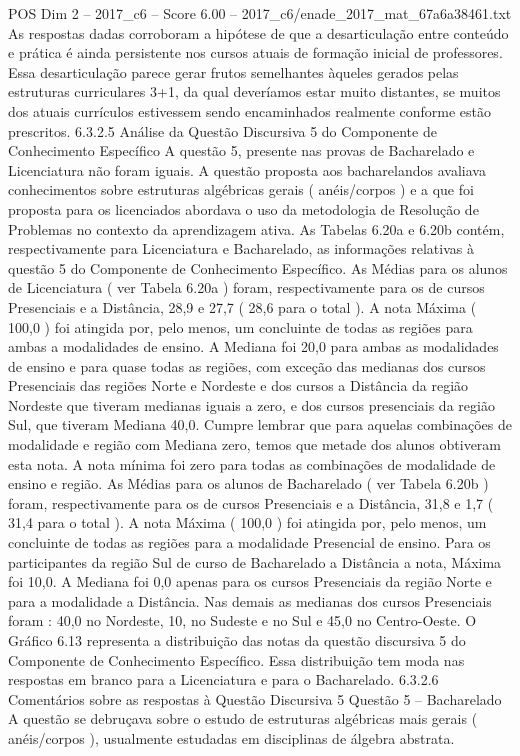 \begin{textsample}{POS Dim 2 – 2017\_c6 – Score 6.00 – 2017\_c6/enade\_2017\_mat\_67a6a38461.txt}
As respostas dadas corroboram a hipótese de que a desarticulação entre conteúdo e prática é ainda persistente nos cursos atuais de formação inicial de professores.
Essa desarticulação parece gerar frutos semelhantes àqueles gerados pelas estruturas curriculares 3+1, da qual deveríamos estar muito distantes, se muitos dos atuais currículos estivessem sendo encaminhados realmente conforme estão prescritos. 6.3.2.5 Análise da Questão Discursiva 5 do Componente de Conhecimento Específico A questão 5, presente nas provas de Bacharelado e Licenciatura não foram iguais.
A questão proposta aos bacharelandos avaliava conhecimentos sobre estruturas algébricas gerais ( anéis/corpos ) e a que foi proposta para os licenciados abordava o uso da metodologia de Resolução de Problemas no contexto da aprendizagem ativa.
As Tabelas 6.20a e 6.20b contém, respectivamente para Licenciatura e Bacharelado, as informações relativas à questão 5 do Componente de Conhecimento Específico.
As Médias para os alunos de Licenciatura ( ver Tabela 6.20a ) foram, respectivamente para os de cursos Presenciais e a Distância, 28,9 e 27,7 ( 28,6 para o total ).
A nota Máxima ( 100,0 ) foi atingida por, pelo menos, um concluinte de todas as regiões para ambas a modalidades de ensino.
A Mediana foi 20,0 para ambas as modalidades de ensino e para quase todas as regiões, com exceção das medianas dos cursos Presenciais das regiões Norte e Nordeste e dos cursos a Distância da região Nordeste que tiveram medianas iguais a zero, e dos cursos presenciais da região Sul, que tiveram Mediana 40,0.
Cumpre lembrar que para aquelas combinações de modalidade e região com Mediana zero, temos que metade dos alunos obtiveram esta nota.
A nota mínima foi zero para todas as combinações de modalidade de ensino e região.
As Médias para os alunos de Bacharelado ( ver Tabela 6.20b ) foram, respectivamente para os de cursos Presenciais e a Distância, 31,8 e 1,7 ( 31,4 para o total ).
A nota Máxima ( 100,0 ) foi atingida por, pelo menos, um concluinte de todas as regiões para a modalidade Presencial de ensino.
Para os participantes da região Sul de curso de Bacharelado a Distância a nota, Máxima foi 10,0.
A Mediana foi 0,0 apenas para os cursos Presenciais da região Norte e para a modalidade a Distância.
Nas demais as medianas dos cursos Presenciais foram : 40,0 no Nordeste, 10, no Sudeste e no Sul e 45,0 no Centro-Oeste.
O Gráfico 6.13 representa a distribuição das notas da questão discursiva 5 do Componente de Conhecimento Específico.
Essa distribuição tem moda nas respostas em branco para a Licenciatura e para o Bacharelado. 6.3.2.6 Comentários sobre as respostas à Questão Discursiva 5 Questão 5 – Bacharelado A questão se debruçava sobre o estudo de estruturas algébricas mais gerais ( anéis/corpos ), usualmente estudadas em disciplinas de álgebra abstrata.

\end{textsample}
